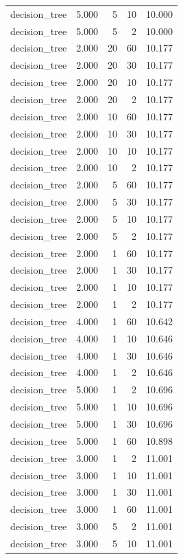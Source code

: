 \begin{tabular}{lrrrr}
decision_tree & 5.000 & 5 & 10 & 10.000 \\
decision_tree & 5.000 & 5 & 2 & 10.000 \\
decision_tree & 2.000 & 20 & 60 & 10.177 \\
decision_tree & 2.000 & 20 & 30 & 10.177 \\
decision_tree & 2.000 & 20 & 10 & 10.177 \\
decision_tree & 2.000 & 20 & 2 & 10.177 \\
decision_tree & 2.000 & 10 & 60 & 10.177 \\
decision_tree & 2.000 & 10 & 30 & 10.177 \\
decision_tree & 2.000 & 10 & 10 & 10.177 \\
decision_tree & 2.000 & 10 & 2 & 10.177 \\
decision_tree & 2.000 & 5 & 60 & 10.177 \\
decision_tree & 2.000 & 5 & 30 & 10.177 \\
decision_tree & 2.000 & 5 & 10 & 10.177 \\
decision_tree & 2.000 & 5 & 2 & 10.177 \\
decision_tree & 2.000 & 1 & 60 & 10.177 \\
decision_tree & 2.000 & 1 & 30 & 10.177 \\
decision_tree & 2.000 & 1 & 10 & 10.177 \\
decision_tree & 2.000 & 1 & 2 & 10.177 \\
decision_tree & 4.000 & 1 & 60 & 10.642 \\
decision_tree & 4.000 & 1 & 10 & 10.646 \\
decision_tree & 4.000 & 1 & 30 & 10.646 \\
decision_tree & 4.000 & 1 & 2 & 10.646 \\
decision_tree & 5.000 & 1 & 2 & 10.696 \\
decision_tree & 5.000 & 1 & 10 & 10.696 \\
decision_tree & 5.000 & 1 & 30 & 10.696 \\
decision_tree & 5.000 & 1 & 60 & 10.898 \\
decision_tree & 3.000 & 1 & 2 & 11.001 \\
decision_tree & 3.000 & 1 & 10 & 11.001 \\
decision_tree & 3.000 & 1 & 30 & 11.001 \\
decision_tree & 3.000 & 1 & 60 & 11.001 \\
decision_tree & 3.000 & 5 & 2 & 11.001 \\
decision_tree & 3.000 & 5 & 10 & 11.001 \\

\end{tabular}
